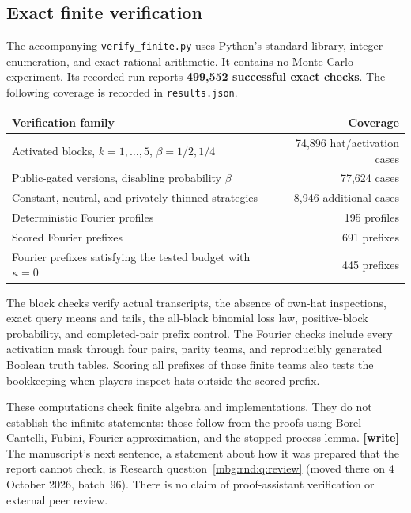 \documentclass[11pt,letterpaper]{article}
\theoremstyle{definition}
\begin{document}
\subsection{Exact finite verification}

The accompanying \texttt{verify\_finite.py} uses Python's standard
library, integer enumeration, and exact rational arithmetic. It
contains no Monte Carlo experiment. Its recorded run reports
\textbf{499,552 successful exact checks}. The following coverage is
recorded in \texttt{results.json}.

\begin{center}
\begin{tabularx}{\textwidth}{@{}Xr@{}}
\toprule
Verification family & Coverage\\
\midrule
Activated blocks, $k=1,\ldots,5$, $\beta=1/2,1/4$
& 74,896 hat/activation cases\\
Public-gated versions, disabling probability $\beta$
& 77,624 cases\\
Constant, neutral, and privately thinned strategies
& 8,946 additional cases\\
Deterministic Fourier profiles & 195 profiles\\
Scored Fourier prefixes & 691 prefixes\\
Fourier prefixes satisfying the tested budget with $\kappa=0$
& 445 prefixes\\
\bottomrule
\end{tabularx}
\end{center}

The block checks verify actual transcripts, the absence of own-hat
inspections, exact query means and tails, the all-black binomial loss
law, positive-block probability, and completed-pair prefix control.
The Fourier checks include every activation mask through four pairs,
parity teams, and reproducibly generated Boolean truth tables. Scoring
all prefixes of those finite teams also tests the bookkeeping when
players inspect hats outside the scored prefix.

These computations check finite algebra and implementations. They do
not establish the infinite statements: those follow from the proofs
using Borel--Cantelli, Fubini, Fourier approximation, and the stopped
process lemma. {\small\textbf{[write]} The manuscript's next sentence, a statement about how it was prepared that the report cannot check, is Research question~\ref{mbg:rnd:q:review} (moved there on 4 October 2026, batch~96).} There is no
claim of proof-assistant verification or external peer review.
\end{document}
